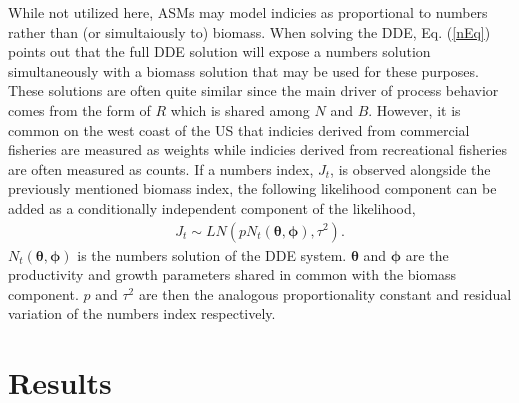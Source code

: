 %
While not utilized here, ASMs may model %
indicies as proportional to numbers rather than (or simultaiously to)
biomass. When solving the DDE, Eq. (\ref{nEq}) points out that the full DDE
solution will expose a numbers solution simultaneously with a biomass solution
that may be used for these purposes. These solutions are often quite similar
since the main driver of process behavior comes from the form of $R$ which is
shared among $N$ and $B$.
However, it is common on the west coast of the US that indicies derived from commercial
fisheries are measured as weights %
while indicies derived from recreational fisheries are often measured as counts.
If a numbers index, $J_t$, is observed alongside the previously
mentioned biomass index, the following likelihood component can be added as a %
conditionally independent component of the likelihood, %
\begin{align}
J_t \sim LN(p N_t(\bm{\theta}, \bm{\phi}), \tau^{2}) \label{nL}.
\end{align}
%
$N_t(\bm{\theta}, \bm{\phi})$ is the numbers solution of the DDE system.
$\bm{\theta}$ and $\bm{\phi}$ are the productivity and growth parameters shared in 
common with the biomass component. $p$ and $\tau^2$ are then the analogous
proportionality constant and residual variation of the numbers index respectively.

%
%

%
\clearpage
\section{Results}



